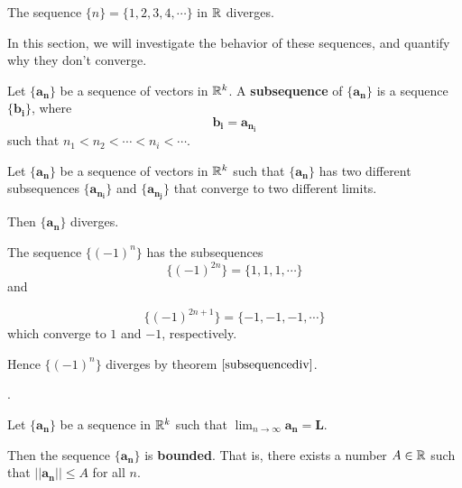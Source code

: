     \begin{example}
    The sequence $\{n\} = \{1, 2, 3, 4, \cdots\}$ in $\mathbb{R}$ diverges.
    \end{example}
    
    In this section, we will investigate the behavior of these sequences, and quantify why they don't converge.


\begin{definition}
    Let $\{\bm{a_n}\}$ be a sequence of vectors in $\mathbb{R}^k$.  A \textbf{subsequence} of $\{\bm{a_n}\}$ is a sequence $\{\bm{b_i}\}$, where $$\bm{b_i} = \bm{a_{n_i}}$$
    such that $n_1 < n_2 < \cdots < n_i < \cdots$.
    \end{definition}

    
    \begin{theorem}\label{subsequencediv}
    Let $\{\bm{a_n}\}$ be a sequence of vectors in $\mathbb{R}^k$ such that $\{\bm{a_n}\}$ has two different subsequences $\{\bm{a_{n_i}}\}$ and $\{\bm{a_{n_j}}\}$ that converge to two different limits.
    
    Then  $\{\bm{a_n}\}$ diverges.
    \end{theorem}
    
    
     \begin{example}
    The sequence $\{(-1)^n\}$ has the subsequences $$\{(-1)^{2n}\} = \{1, 1, 1, \cdots\}$$ and
    
    $$\{(-1)^{2n+1}\}= \{-1, -1, -1, \cdots\}$$ which converge to $1$ and $-1$, respectively.
    
    Hence $\{(-1)^n\}$ diverges by theorem $\ref{subsequencediv}$.
    \end{example}

    .

\begin{theorem}

Let $\{\bm{a_n}\}$ be a sequence in $\mathbb{R}^k$ such that $\lim_{n \to \infty}\bm{a_n} = \bm{L}$.

\vspace{1em}

Then the sequence $\{\bm{a_n}\}$ is \textbf{bounded}.  That is, there exists a number $A \in \mathbb{R}$ such that $||\bm{a_n}|| \leq A$ for all $n$.
\end{theorem}
    
